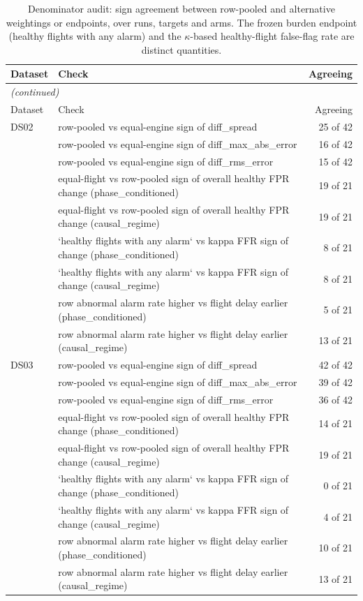 \begin{scriptsize}
\begin{longtable}{lp{}r}
\caption{Denominator audit: sign agreement between row-pooled and alternative weightings or endpoints, over runs, targets and arms. The frozen burden endpoint (healthy flights with any alarm) and the $\kappa$-based healthy-flight false-flag rate are distinct quantities.}\label{tab:s12_weighting}\\
\toprule
Dataset & Check & Agreeing \\
\midrule
\endfirsthead
\multicolumn{3}{l}{\emph{(continued)}}\\
\toprule
Dataset & Check & Agreeing \\
\midrule
\endhead
\bottomrule
\endfoot
DS02 & row-pooled vs equal-engine sign of diff\_spread & 25 of 42 \\
 & row-pooled vs equal-engine sign of diff\_max\_abs\_error & 16 of 42 \\
 & row-pooled vs equal-engine sign of diff\_rms\_error & 15 of 42 \\
 & equal-flight vs row-pooled sign of overall healthy FPR change (phase\_conditioned) & 19 of 21 \\
 & equal-flight vs row-pooled sign of overall healthy FPR change (causal\_regime) & 19 of 21 \\
 & `healthy flights with any alarm` vs kappa FFR sign of change (phase\_conditioned) & 8 of 21 \\
 & `healthy flights with any alarm` vs kappa FFR sign of change (causal\_regime) & 8 of 21 \\
 & row abnormal alarm rate higher vs flight delay earlier (phase\_conditioned) & 5 of 21 \\
 & row abnormal alarm rate higher vs flight delay earlier (causal\_regime) & 13 of 21 \\
\midrule
DS03 & row-pooled vs equal-engine sign of diff\_spread & 42 of 42 \\
 & row-pooled vs equal-engine sign of diff\_max\_abs\_error & 39 of 42 \\
 & row-pooled vs equal-engine sign of diff\_rms\_error & 36 of 42 \\
 & equal-flight vs row-pooled sign of overall healthy FPR change (phase\_conditioned) & 14 of 21 \\
 & equal-flight vs row-pooled sign of overall healthy FPR change (causal\_regime) & 19 of 21 \\
 & `healthy flights with any alarm` vs kappa FFR sign of change (phase\_conditioned) & 0 of 21 \\
 & `healthy flights with any alarm` vs kappa FFR sign of change (causal\_regime) & 4 of 21 \\
 & row abnormal alarm rate higher vs flight delay earlier (phase\_conditioned) & 10 of 21 \\
 & row abnormal alarm rate higher vs flight delay earlier (causal\_regime) & 13 of 21 \\
\end{longtable}
\end{scriptsize}

